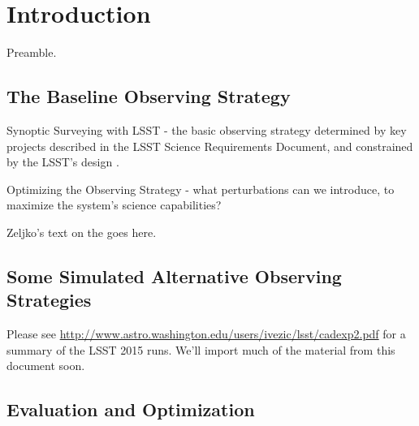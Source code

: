 
\chapter[Introduction]{Introduction}
\def\chpname{intro}\label{chp:\chpname}


Preamble.

\listofopsimdbs



\section{The Baseline Observing Strategy}
\def\secname{intro:baseline}\label{sec:\secname}

Synoptic Surveying with LSST - the basic observing strategy determined
by key projects described in the LSST Science Requirements Document,
and constrained by the LSST's design \citep{IvezicEtal2008}.

Optimizing the Observing Strategy - what perturbations can we
introduce, to maximize the system's science capabilities?




Zeljko's text on the  goes here.

\navigationbar


\section{Some Simulated Alternative Observing Strategies}
\def\secname{intro:alternatives}\label{sec:\secname}


Please see
\url{http://www.astro.washington.edu/users/ivezic/lsst/cadexp2.pdf}
for a summary of the LSST 2015 \OpSim runs. We'll import much of the
material from this document soon.


\navigationbar


\section{Evaluation and Optimization}
\def\secname{intro:evaluation}\label{sec:\secname}

